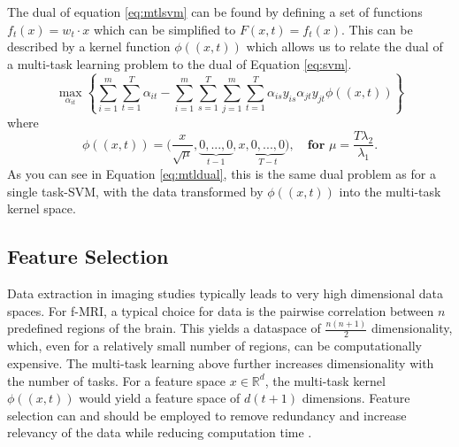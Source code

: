 \documentclass{llncs}
\begin{document}
The dual of equation \ref{eq:mtlsvm} can be found by defining a set of functions $f_t(x) = w_t \cdot x$ which can be simplified to $F(x,t) = f_t(x)$.  This can be described by a kernel function $\phi((x,t))$ which allows us to relate the dual of a multi-task learning problem to the dual of Equation \ref{eq:svm}.
\begin{equation}
\label{eq:mtldual}
\max_{\alpha_{it}}  \left\{ \sum_{i=1}^m\sum_{t=1}^T \alpha_{it} -  \sum_{i=1}^m\sum_{s=1}^T\sum_{j=1}^m\sum_{t=1}^T  \alpha_{is}y_{is}\alpha_{jt}y_{jt}\phi((x,t))      \right\}
\end{equation}
where
\begin{equation}
\phi((x,t)) = \big(\frac{x}{\sqrt{\mu}}, \underbrace{0,...,0}_{t-1}, x, \underbrace{0,...,0}_{T-t} \big), \quad \textbf{for  } \mu = \frac{T\lambda_2}{\lambda_1} .
\end{equation}
As you can see in Equation \ref{eq:mtldual}, this is the same dual problem as for a single task-SVM, with the data transformed by $\phi((x,t))$ into the multi-task kernel space.




\subsection{Feature Selection}
\label{subsec:FS}
Data extraction in imaging studies typically leads to very high dimensional data spaces.  For f-MRI, a typical choice for data is the pairwise correlation between $n$ predefined regions of the brain.  This yields a dataspace of $\frac{n(n+1)}{2}$ dimensionality, which, even for a relatively small number of regions, can be  computationally expensive.  The multi-task learning above further increases dimensionality with the number of tasks. For a feature space $x \in \mathbb{R}^d$, the multi-task kernel $\phi((x,t))$ would yield a feature space of $d(t+1)$ dimensions.  Feature selection can and should be employed to remove redundancy and increase relevancy of the data while reducing computation time \cite{featsel}.
\end{document}
